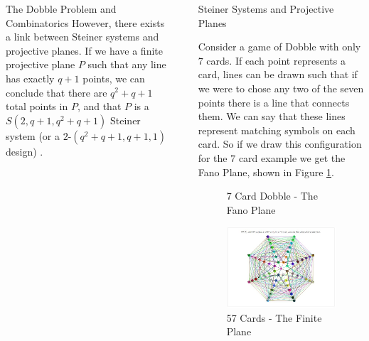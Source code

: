\documentclass[final]{beamer}
\newlength{\sepwidth}
\newlength{\colwidth}
\newcommand{\separatorcolumn}{\begin{column}{\sepwidth}\end{column}}
\begin{document}
\begin{frame}[t]
\begin{columns}[t]
\begin{column}{\colwidth}
\begin{alertblock}{The Dobble Problem and Combinatorics}
However, there exists a link between Steiner systems and projective planes. If we have a finite projective plane $P$ such that any line has exactly $q+1$ points, we can conclude that there are $q^2+q+1$ total points in $P$, and that $P$ is a $S(2, q+ 1, q^2 +q+ 1)$
Steiner system (or a $2$-$(q^2 +q+ 1, q + 1, 1)$ design) \cite{storme2006}.
  \end{alertblock}

\end{column}

\separatorcolumn

\begin{column}{\colwidth}

  \begin{block}{Steiner Systems and Projective Planes}

    Consider a game of Dobble with only $7$ cards. If each point represents a card, lines can be drawn such that if we were to chose any two of the seven points there is a line that connects them. We can say that these lines represent matching symbols on each card. So if we draw this configuration for the $7$ card example we get the Fano Plane, shown in Figure \ref{fig:fano}.
    \begin{multicols}{2}
\begin{figure}
      \centering
      \caption{7 Card Dobble - The Fano Plane}
      \label{fig:fano}
\end{figure}

\begin{figure}
    \includegraphics[width=13cm]{pporder7}
    \caption{57 Cards - The Finite Plane \cite{beresford2011}}
    \label{fig:pporder7}
\end{figure}
    \end{multicols}
  

\end{block}
\end{column}
\end{columns}
\end{frame}
\end{document}
